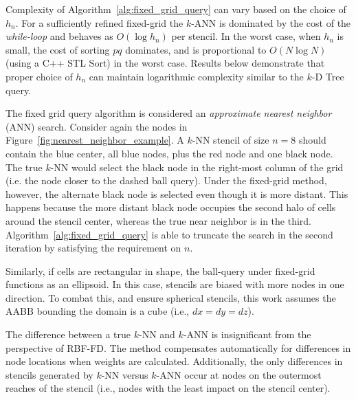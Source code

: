 \documentclass{report}
\begin{document}
Complexity of Algorithm~\ref{alg:fixed_grid_query} can vary based on the choice of $h_n$. For a sufficiently refined fixed-grid the $k$-ANN is dominated by the cost of the \emph{while-loop} and behaves as $O(\log h_n)$ per stencil. In the worst case, when $h_n$ is small, the cost of sorting $pq$ dominates, and is proportional to $O(N \log N)$ (using a C++ STL Sort) in the worst case. %
Results below demonstrate that proper choice of $h_n$ can maintain logarithmic complexity similar to the $k$-D Tree query. 


The fixed grid query algorithm is considered an \emph{approximate nearest neighbor} (ANN) search. Consider again the nodes in Figure~\ref{fig:nearest_neighbor_example}. A $k$-NN stencil of size $n=8$ should contain the blue center, all blue nodes, plus the red node and one black node. The true $k$-NN would select the black node in the right-most column of the grid (i.e. the node closer to the dashed ball query). Under the fixed-grid method, however, the alternate black node is selected even though it is more distant. This happens because the more distant black node occupies the second halo of cells around the stencil center, whereas the true near neighbor is in the third. Algorithm~\ref{alg:fixed_grid_query} is able to truncate the search in the second iteration by satisfying the requirement on $n$. 

Similarly, if cells are rectangular in shape, the ball-query under fixed-grid functions as an ellipsoid. In this case, stencils are biased with more nodes in one direction. To combat this, and ensure spherical stencils, this work assumes the AABB bounding the domain is a cube (i.e., $dx = dy = dz$). 

The difference between a true $k$-NN and $k$-ANN is insignificant from the perspective of RBF-FD. The method compensates automatically for differences in node locations when weights are calculated. Additionally, the only differences in stencils generated by $k$-NN versus $k$-ANN occur at nodes on the outermost reaches of the stencil (i.e., nodes with the least impact on the stencil center).


\end{document}
